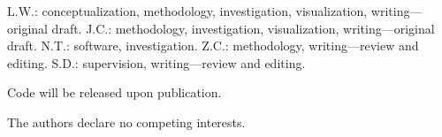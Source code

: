 \documentclass[pdflatex,sn-nature]{sn-jnl}%
\begin{document}

L.W.: conceptualization, methodology, investigation, visualization, writing—original draft.
J.C.: methodology, investigation, visualization, writing—original draft.
N.T.: software, investigation.
Z.C.: methodology, writing—review and editing.
S.D.: supervision, writing—review and editing.






Code will be released upon publication.

The authors declare no competing interests.


% 
\end{document}
